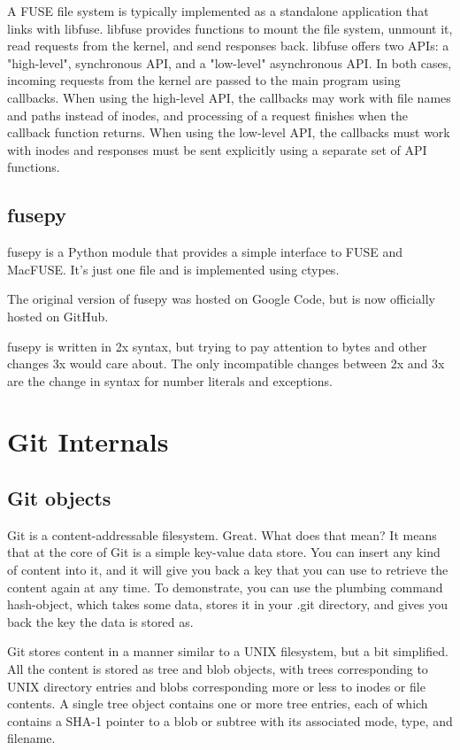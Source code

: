        A FUSE file system is typically implemented as a standalone application that links with libfuse. libfuse provides functions to mount the file system, unmount it, read requests from the kernel, and send responses back. libfuse offers two APIs: a "high-level", synchronous API, and a "low-level" asynchronous API. In both cases, incoming requests from the kernel are passed to the main program using callbacks. When using the high-level API, the callbacks may work with file names and paths instead of inodes, and processing of a request finishes when the callback function returns. When using the low-level API, the callbacks must work with inodes and responses must be sent explicitly using a separate set of API functions.
       
     \subsection{fusepy}
       fusepy is a Python module that provides a simple interface to FUSE and MacFUSE. It's just one file and is implemented using ctypes.

       The original version of fusepy was hosted on Google Code, but is now officially hosted on GitHub.
       
       fusepy is written in 2x syntax, but trying to pay attention to bytes and other changes 3x would care about. The only incompatible changes between 2x and 3x are the change in syntax for number literals and exceptions.
    
  \section{Git Internals}
     \subsection{Git objects}
       Git is a content-addressable filesystem. Great. What does that mean? It means that at the core of Git is a simple key-value data store. You can insert any kind of content into it, and it will give you back a key that you can use to retrieve the content again at any time. To demonstrate, you can use the plumbing command hash-object, which takes some data, stores it in your .git directory, and gives you back the key the data is stored as.
       
       Git stores content in a manner similar to a UNIX filesystem, but a bit simplified. All the content is stored as tree and blob objects, with trees corresponding to UNIX directory entries and blobs corresponding more or less to inodes or file contents. A single tree object contains one or more tree entries, each of which contains a SHA-1 pointer to a blob or subtree with its associated mode, type, and filename.
        
